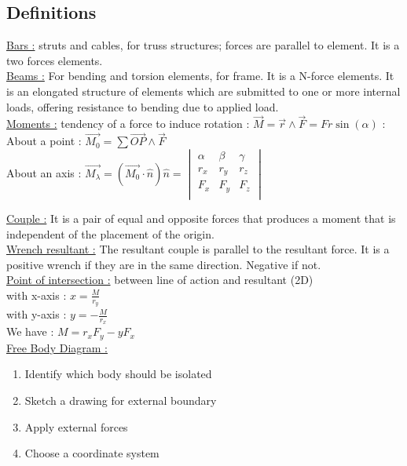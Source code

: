 \documentclass[../main.tex]{subfiles}
\begin{document}
\localtableofcontents
\subsection{Definitions}
\quad \underline{Bars :} struts and cables, for truss structures; forces are parallel to element. It is a two forces elements.\\

\quad \underline{Beams :} For bending and torsion elements, for frame. It is a N-force elements. It is an elongated structure of elements which are submitted to one or more internal loads, offering resistance to bending due to applied load.\\

\quad \underline{Moments :} tendency of a force to induce rotation : $\vec{M} = \vec{r} \wedge \vec{F} = Fr \sin(\alpha)$ : \\

\quad \quad About a point : $\vec{M_0} = \sum \vec{OP} \wedge \vec{F}$\\

\quad \quad About an axis : $\vec{M_{\lambda}} = (\vec{M_0}\cdot \hat{n}) \hat{n} = \begin{vmatrix}
    \alpha & \beta & \gamma\\
    r_x & r_y & r_z\\
    F_x & F_y&F_z\\
\end{vmatrix}$

\quad \underline{Couple :} It is a pair of equal and opposite forces that produces a moment that is independent of the placement of the origin.\\

\quad \underline{Wrench resultant :} The resultant couple is parallel to the resultant force. It is a positive wrench if they are in the same direction. Negative if not.\\

\quad \underline{Point of intersection :} between line of action and resultant (2D)\\

\quad \quad with x-axis : $x = \frac{M}{r_y}$\\

\quad \quad with y-axis : $y = -\frac{M}{r_x}$\\
We have : $M = r_x F_y - y F_x$\\

\quad \underline{Free Body Diagram :}\\
\begin{enumerate}
    \item Identify which body should be isolated\\
    \item Sketch a drawing for external boundary\\
    \item Apply external forces\\
    \item Choose a coordinate system\\
\end{enumerate}
\end{document}
